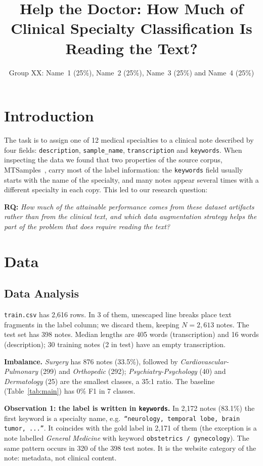 \documentclass[twocolumn,10pt]{article}
\title{Help the Doctor: How Much of Clinical Specialty Classification Is Reading the Text?}
\author{Group XX: Name~1 (25\%), Name~2 (25\%), Name~3 (25\%) and Name~4 (25\%)}
\affil{Instituto Superior Técnico, Universidade de Lisboa}
\date{}
\newcommand{\spec}[1]{\textit{#1}}
\begin{document}
\maketitle

\section{Introduction}

The task is to assign one of 12 medical specialties to a clinical note described by four fields: \texttt{description}, \texttt{sample\_name}, \texttt{transcription} and \texttt{keywords}. When inspecting the data we found that two properties of the source corpus, MTSamples~\cite{mtsamples}, carry most of the label information: the \texttt{keywords} field usually starts with the name of the specialty, and many notes appear several times with a different specialty in each copy. This led to our research question:

\textbf{RQ:} \emph{How much of the attainable performance comes from these dataset artifacts rather than from the clinical text, and which data augmentation strategy helps the part of the problem that does require reading the text?}

\section{Data}

\subsection{Data Analysis}

\texttt{train.csv} has 2,616 rows. In 3 of them, unescaped line breaks place text fragments in the label column; we discard them, keeping $N=2{,}613$ notes. The test set has 398 notes. Median lengths are 405 words (transcription) and 16 words (description); 30 training notes (2 in test) have an empty transcription.

\textbf{Imbalance.} \spec{Surgery} has 876 notes (33.5\%), followed by \spec{Cardiovascular-Pulmonary} (299) and \spec{Orthopedic} (292); \spec{Psychiatry-Psychology} (40) and \spec{Dermatology} (25) are the smallest classes, a 35:1 ratio. The baseline (Table~\ref{tab:main}) has 0\% F1 in 7 classes.

\textbf{Observation 1: the label is written in \texttt{keywords}.} In 2,172 notes (83.1\%) the first keyword is a specialty name, e.g.\ \texttt{``neurology, temporal lobe, brain tumor, ...''}. It coincides with the gold label in 2,171 of them (the exception is a note labelled \spec{General Medicine} with keyword \texttt{obstetrics / gynecology}). The same pattern occurs in 320 of the 398 test notes. It is the website category of the note: metadata, not clinical content.
\end{document}
